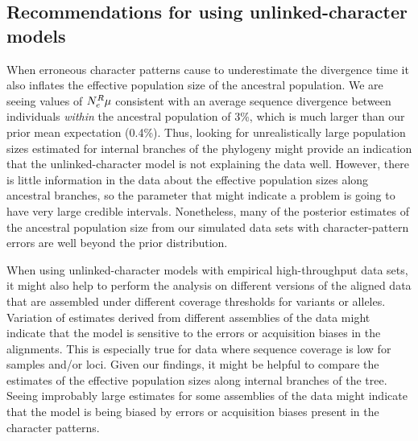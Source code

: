 \subsection{Recommendations for using unlinked-character models}

When erroneous character patterns cause \ecoevolity to underestimate the
divergence time it also inflates the effective population size of the ancestral
population.
We are seeing values of $N_{e}^{R{}}\mu$ consistent with an average sequence
divergence between individuals \emph{within} the ancestral population of 3\%,
which is much larger than our prior mean expectation (0.4\%).
Thus, looking for unrealistically large population sizes estimated for internal
branches of the phylogeny might provide an indication that the
unlinked-character model is not explaining the data well.
However, there is little information in the data about the effective population
sizes along ancestral branches,
so the parameter that might indicate a problem is going to have very
large credible intervals.
Nonetheless, many of the posterior estimates of the ancestral population size
from our simulated data sets with character-pattern errors are well beyond the
prior distribution.

When using unlinked-character models with empirical high-throughput data sets,
it might also help to perform the analysis on different versions of the aligned
data that are assembled under different coverage thresholds for variants or
alleles.
Variation of estimates derived from different assemblies of the data might
indicate that the model is sensitive to the errors or acquisition biases in the
alignments.
This is especially true for data where sequence coverage is low for samples
and/or loci.
Given our findings, it might be helpful to compare the estimates of the
effective population sizes along internal branches of the tree.
Seeing improbably large estimates for some assemblies of the
data might indicate that the model is being biased by
errors or acquisition biases present in the character patterns.

